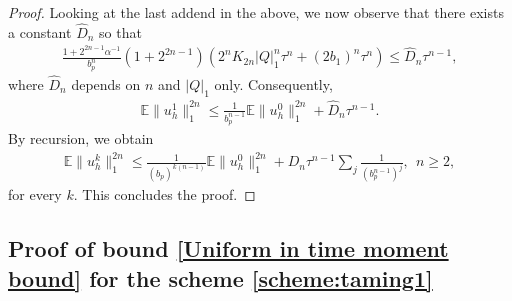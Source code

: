 \documentclass[reqno, 11pt]{amsart}
\theoremstyle{plain}
\theoremstyle{definition}
\theoremstyle{remark}
\numberwithin{equation}{section}
\numberwithin{theorem}{section}
\begin{document}
{\begin{proof}
Looking at the last addend in the above, we now observe that there exists a constant $\hat D_n$ so that
\begin{align}
\frac{1+2^{2n-1}\alpha^{-1}}{b_p^n}(1+2^{2n-1})(2^n K_{2n}|Q|_1^n\tau^n+(2b_1)^n\tau^n)\leq \hat D_n\tau^{n-1}, 
\end{align}
where $\hat D_n$ depends on $n$ and $|Q|_1$ only. Consequently,
\begin{align}
\mathbb{E}\|u_h^1\|_1^{2n}\leq \frac{1}{b_p^{n-1}}\mathbb{E}\| u_h^0\|_1^{2n}+\hat D_n\tau^{n-1}. 
\end{align}
By recursion, we obtain
\begin{align}
\mathbb{E}\| u_h^k\|_1^{2n}\leq \frac{1}{(b_p)^{k(n-1)}}\mathbb{E}\| u_h^0\|_1^{2n}+D_n \tau^{n-1} \sum_j \frac{1}{(b_p^{n-1})^j}, \ \ n\geq 2,
\end{align}
for every $k$. This concludes the proof.
\end{proof}






\subsection{Proof of bound \ref{Uniform in time moment bound} for the scheme \eqref{scheme:taming1}}\label{subsec: tamed H3}

}
\end{document}

